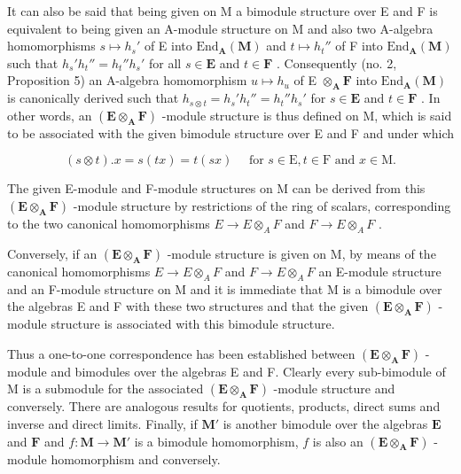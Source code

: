 It can also be said that being given on M a bimodule structure over E and F is equivalent to being given an A-module structure on M and also two A-algebra homomorphisms \(s \mapsto h_s'\) of E into \(\mathrm{End}_{\mathbf{A}}(\mathbf{M})\) and \(t \mapsto h_t''\) of F into \(\mathrm{End}_{\mathbf{A}}(\mathbf{M})\) such that \(h_s'h_t'' = h_t''h_s'\) for all \(s \in \mathbf{E}\) and \(t \in \mathbf{F}\) . Consequently (no. 2, Proposition 5) an A-algebra homomorphism \(u \mapsto h_u\) of E \(\otimes_{\mathbf{A}} \mathbf{F}\) into \(\mathrm{End}_{\mathbf{A}}(\mathbf{M})\) is canonically derived such that \(h_{s \otimes t} = h_s'h_t'' = h_t''h_s'\) for \(s \in \mathbf{E}\) and \(t \in \mathbf{F}\) . In other words, an \((\mathbf{E} \otimes_{\mathbf{A}} \mathbf{F})\) -module structure is thus defined on M, which is said to be associated with the given bimodule structure over E and F and under which

\[
(s \otimes t). x = s (t x) = t (s x) \quad \text { for } s \in \mathrm{E}, t \in \mathrm{F} \text { and } x \in \mathrm{M}.
\]

The given E-module and F-module structures on M can be derived from this \((\mathbf{E} \otimes_{\mathbf{A}} \mathbf{F})\) -module structure by restrictions of the ring of scalars, corresponding to the two canonical homomorphisms \(E \to E \otimes_{A} F\) and \(F \to E \otimes_{A} F\) .

Conversely, if an \((\mathbf{E} \otimes_{\mathbf{A}} \mathbf{F})\) -module structure is given on M, by means of the canonical homomorphisms \(E \to E \otimes_{A} F\) and \(F \to E \otimes_{A} F\) an E-module structure and an F-module structure on M and it is immediate that M is a bimodule over the algebras E and F with these two structures and that the given \((\mathbf{E} \otimes_{\mathbf{A}} \mathbf{F})\) -module structure is associated with this bimodule structure.

Thus a one-to-one correspondence has been established between \((\mathbf{E} \otimes_{\mathbf{A}} \mathbf{F})\) -module and bimodules over the algebras E and F. Clearly every sub-bimodule of M is a submodule for the associated \((\mathbf{E} \otimes_{\mathbf{A}} \mathbf{F})\) -module structure and conversely. There are analogous results for quotients, products, direct sums and inverse and direct limits. Finally, if \(\mathbf{M}'\) is another bimodule over the algebras \(\mathbf{E}\) and \(\mathbf{F}\) and \(f\colon \mathbf{M}\to \mathbf{M}'\) is a bimodule homomorphism, \(f\) is also an \((\mathbf{E}\otimes_{\mathbf{A}}\mathbf{F})\) -module homomorphism and conversely.

